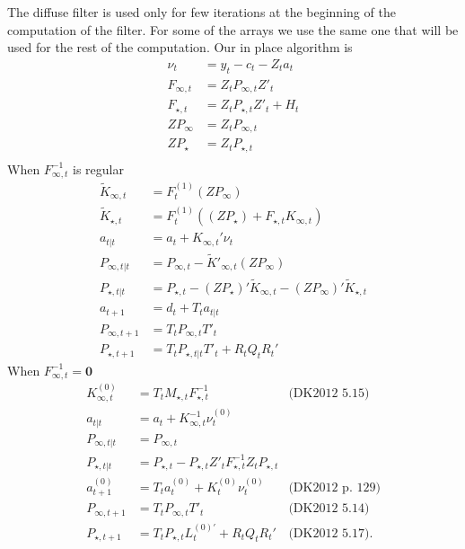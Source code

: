 \documentclass{article}
\begin{document}
The diffuse filter is used only for few iterations at the beginning of
the computation of the filter. For some of the arrays we use the same
one that will be used for the rest of the computation. Our in place
algorithm is
\begin{align*}
  \nu_t &= y_t - c_t - Z_t a_t \\
  F_{\infty,t} &= Z_tP_{\infty,t}Z'_t \\
  F_{\star,t} &= Z_tP_{\star,t}Z'_t + H_t \\
  ZP_\infty &= Z_tP_{\infty,t}\\
  ZP_\star &= Z_tP_{\star,t} \\
\end{align*}
When $F^{-1}_{\infty,t}$ is regular
\begin{align*}
  \tilde K_{\infty,t} &= F^{(1)}_t(ZP_{\infty}) \\
  \tilde K_{\star,t} &=  F^{(1)}_t((ZP_{\star}) + F_{\star,t}K_{\infty,t}) \\
  a_{t|t} &= a_t + K_{\infty,t}'\nu_t\\
  P_{\infty,t|t} &= P_{\infty,t} - \tilde K'_{\infty,t}(ZP_{\infty}) \\
  P_{\star,t|t} &= P_{\star,t} - (ZP_{\star})'\tilde K_{\infty,t}
                  - (ZP_{\infty})'\tilde K_{\star,t}\\
  a_{t+1} &= d_t + T_ta_{t|t} \\
  P_{\infty,t+ 1} &= T_tP_{\infty,t}T'_t\\
  P_{\star, t+1} &= T_tP_{\star,t|t}T'_t + R_tQ_tR_t'
\end{align*}
When $F^{-1}_{\infty,t} = \mathbf{0}$
\begin{align*}
  K_{\infty,t}^{(0)} &= T_tM_{\star,t}F^{-1}_{\star,t}& \mbox{(DK2012 5.15)}\\
  a_{t|t} &= a_t + K^{-1}_{\infty,t}\nu^{(0)}_t\\
  P_{\infty,t|t} &= P_{\infty,t} \\
  P_{\star,t|t} &= P_{\star,t} - P_{\star,t}Z'_t
                  F^{-1}_{\star,t}Z_tP_{\star,t} \\
  a^{(0)}_{t+1} &= T_ta^{(0)}_t + K^{(0)}_t\nu^{(0)}_t & \mbox{(DK2012 
                                                         p. 129)}\\
  P_{\infty,t+ 1} &= T_tP_{\infty,t}T'_t & \mbox{(DK2012 5.14)}\\
  P_{\star, t+1} &= T_tP_{\star,t}L^{(0)'}_t + R_tQ_tR_t' & \mbox{(DK2012 5.17).}
\end{align*}
\end{document}
